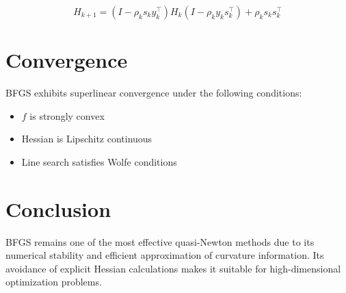 \documentclass{article}
\begin{document}
\begin{equation}
H_{k+1} = \left(I - \rho_k s_k y_k^\top \right) H_k \left(I - \rho_k y_k s_k^\top \right) + \rho_k s_k s_k^\top
\end{equation}

\section{Convergence}
BFGS exhibits superlinear convergence under the following conditions:
\begin{itemize}
   \item \( f \) is strongly convex
   \item Hessian is Lipschitz continuous
   \item Line search satisfies Wolfe conditions
\end{itemize}

\section{Conclusion}
BFGS remains one of the most effective quasi-Newton methods due to its numerical stability and efficient approximation of curvature information. Its avoidance of explicit Hessian calculations makes it suitable for high-dimensional optimization problems.
\end{document}
